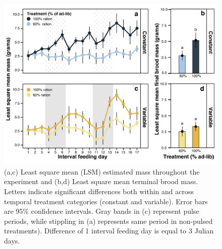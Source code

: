 \documentclass[11pt,]{article}
\begin{document}
\begin{figure}
\centering
\includegraphics{./fig2_mc_mass.png}
\caption{(a,c) Least square mean (LSM) estimated mass throughout the
experiment and (b,d) Least square mean terminal brood mass. Letters
indicate significant differences both within and across temporal
treatment categories (constant and variable). Error bars are 95\%
confidence intervals. Gray bands in (c) represent pulse periods, while
stippling in (a) represents same period in non-pulsed treatments).
Difference of 1 interval feeding day is equal to 3 Julian days.}
\end{figure}

\clearpage

\newpage
\end{document}
